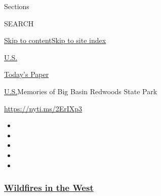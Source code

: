 Sections

SEARCH

\protect\hyperlink{site-content}{Skip to
content}\protect\hyperlink{site-index}{Skip to site index}

\href{https://www.nytimes3xbfgragh.onion/section/us}{U.S.}

\href{https://myaccount.nytimes3xbfgragh.onion/auth/login?response_type=cookie\&client_id=vi}{}

\href{https://www.nytimes3xbfgragh.onion/section/todayspaper}{Today's
Paper}

\href{/section/us}{U.S.}\textbar{}Memories of Big Basin Redwoods State
Park

\url{https://nyti.ms/2ErIXp3}

\begin{itemize}
\item
\item
\item
\item
\item
\end{itemize}

\hypertarget{wildfires-in-the-west}{%
\subsubsection{\texorpdfstring{\href{https://www.nytimes3xbfgragh.onion/spotlight/california-wildfires?name=styln-california-wildfires\&region=TOP_BANNER\&block=storyline_menu_recirc\&action=click\&pgtype=Article\&impression_id=0575a170-f52d-11ea-afee-9f6e96515e5b\&variant=undefined}{Wildfires
in the West}}{Wildfires in the West}}\label{wildfires-in-the-west}}

